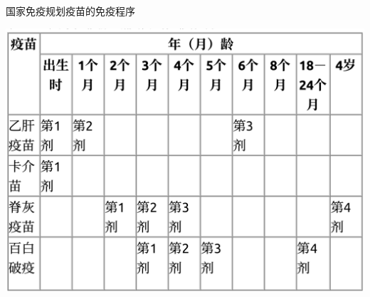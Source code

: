 \begin{table}[htbp]
    \centering
    \caption{国家免疫规划疫苗的免疫程序}
    \label{tab11-1}
    \includegraphics[width=.8\textwidth]{images/tab11-1.png}
\end{table}
\FloatBarrier
